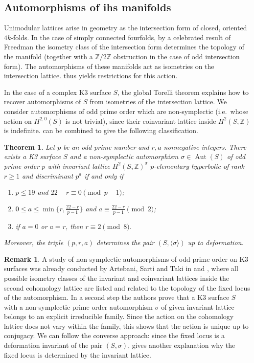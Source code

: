 \documentclass{amsart}
\theoremstyle{definition}
\newtheorem{remark}[definition]{Remark}
\theoremstyle{plain}
\newtheorem{theorem}[definition]{Theorem}
\DeclareMathOperator{\aut}{Aut}
\newcommand{\ZZ}{\mathbb{Z}}
\newcommand{\IZ}{\mathbb{Z}}
\begin{document}
\subsection*{Automorphisms of ihs manifolds}
Unimodular lattices arise in geometry as the intersection form of closed, oriented $4k$-folds. In the case of simply connected fourfolds, by a celebrated result of Freedman \cite[Thm.\ 1.5]{freedman} the isometry class of the intersection form determines the topology of the manifold (together with a $\ZZ/2\ZZ$ obstruction in the case of odd intersection form). The automorphisms of these manifolds act as isometries on the intersection lattice.  thus yields restrictions for this action.

In the case of a complex K3 surface $S$, the global Torelli theorem explains how to recover automorphisms of $S$ from isometries of the intersection lattice. We consider automorphisms of odd prime order which are non-symplectic (i.e.\ whose action on $H^{2,0}(S)$ is not trivial), since their coinvariant lattice inside $H^2(S,\IZ)$ is indefinite.  can be combined to give the following classification.


\begin{theorem}\label{thm:K3-classification}
Let $p$ be an odd prime number and $r,a$ nonnegative integers.
There exists a K3 surface $S$ and a non-symplectic automorphism $\sigma \in \aut(S)$ of odd prime order $p$
with invariant lattice $H^2(S,\ZZ)^\sigma$ $p$-elementary hyperbolic of rank $r \geq 1$ and discriminant $p^a$
if and only if
\begin{enumerate}
\setlength{\itemsep}{5pt}
\item  $p \leq 19$ and $22-r \equiv 0 \pmod{p-1}$;
\item  $0 \leq a \leq \min\{r, \frac{22-r}{p-1}\}$ and $a \equiv \frac{22-r}{p-1} \pmod{2}$;
\item if $a=0$ or $a=r$, then $r \equiv 2 \pmod{8}$.
\end{enumerate}
Moreover, the triple $(p,r,a)$ determines the pair $(S, \langle\sigma\rangle)$ up to deformation.
\end{theorem}


\begin{remark}
A study of non-symplectic automorphisms of odd prime order on K3 surfaces was already conducted by Artebani, Sarti and Taki in \cite{autom_k3_ord3} and \cite{autom_k3}, where all possible isometry classes of the invariant and coinvariant lattices inside the second cohomology lattice are listed and related to the topology of the fixed locus of the automorphism.
In a second step the authors prove that a K3 surface $S$ with a non-symplectic prime order automorphism $\sigma$ of given invariant lattice belongs to an explicit irreducible family. Since the action on the cohomology lattice does not vary within the family, this shows that the action is unique up to conjugacy. We can follow the converse approach: since the fixed locus is a deformation invariant of the pair $(S,\sigma)$,  gives another explanation why the fixed locus is determined by the invariant lattice.
\end{remark}
\end{document}
